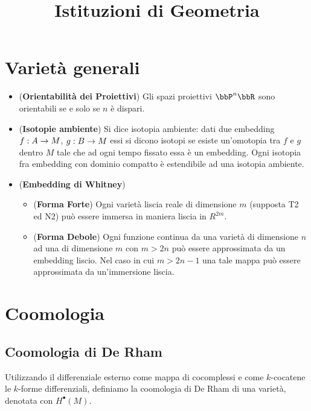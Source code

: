 \documentclass[a4paper,NoNotes,GeneralMath]{stdmdoc}
\begin{document}
\title{Istituzioni di Geometria}

\section{Varietà generali}
\begin{itemize}
\item ({\bf Orientabilità dei Proiettivi}) Gli spazi proiettivi $\bbP^n\bbR$ sono orientabili se e solo se $n$ è dispari.
\item ({\bf Isotopie ambiente}) Si dice isotopia ambiente: dati due embedding $f: A \rightarrow M$, $g: B \rightarrow M$ essi si dicono isotopi se esiste un'omotopia tra $f$ e $g$ dentro $M$ tale che ad ogni tempo fissato essa è un embedding.
  Ogni isotopia fra embedding con dominio compatto è estendibile ad una isotopia ambiente.
\item ({\bf Embedding di Whitney})
  \begin{itemize}
  \item ({\bf Forma Forte}) Ogni varietà liscia reale di dimensione $m$ (supposta T2 ed N2) può essere immersa in maniera liscia in $R^{2m}$.
  \item ({\bf Forma Debole}) Ogni funzione continua da una varietà di dimensione $n$ ad una di dimensione $m$ con $m > 2n$ può essere approssimata da un embedding liscio. Nel caso in cui $m > 2n - 1$ una tale mappa può essere approssimata da un'immersione liscia.
  \end{itemize}
\end{itemize}

\section{Coomologia}
\subsection{Coomologia di De Rham}
Utilizzando il differenziale esterno come mappa di cocomplessi e come $k$-cocatene le $k$-forme differenziali, definiamo la coomologia di De Rham di una varietà, denotata con $H^\bullet (M)$.
\end{document}
